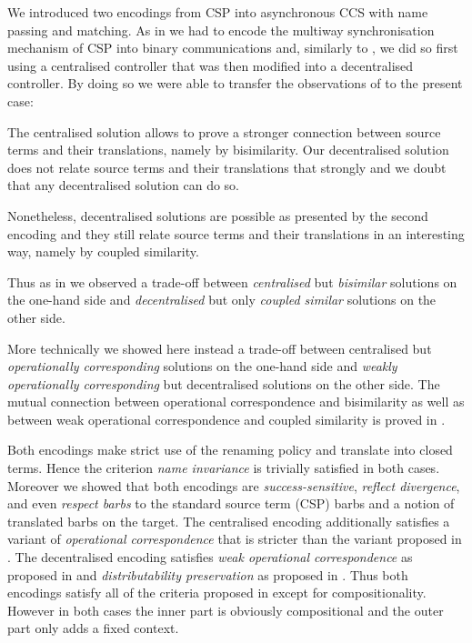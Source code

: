 \documentclass[copyright,creativecommons]{eptcs}
\begin{document}
We introduced two encodings from CSP into asynchronous CCS with name passing and matching.
As in \cite{parrowCoupled92} we had to encode the multiway synchronisation mechanism of CSP into binary communications and, similarly to \cite{parrowCoupled92}, we did so first using a centralised controller that was then modified into a decentralised controller.
By doing so we were able to transfer the observations of \cite{parrowCoupled92} to the present case:
\begin{compactenum}
	\item The centralised solution allows to prove a stronger connection between source terms and their translations, namely by bisimilarity. Our decentralised solution does not relate source terms and their translations that strongly and we doubt that any decentralised solution can do so.
	\item Nonetheless, decentralised solutions are possible as presented by the second encoding and they still relate source terms and their translations in an interesting way, namely by coupled similarity.
\end{compactenum}
Thus as in \cite{parrowCoupled92} we observed a trade-off between \emph{centralised} but \emph{bisimilar} solutions on the one-hand side and \emph{decentralised} but only \emph{coupled similar} solutions on the other side.

More technically we showed here instead a trade-off between centralised but \emph{operationally corresponding} solutions on the one-hand side and \emph{weakly operationally corresponding} but decentralised solutions on the other side.
The mutual connection between operational correspondence and bisimilarity as well as between weak operational correspondence and coupled similarity is proved in \cite{petersGlabbeek15}.

Both encodings make strict use of the renaming policy and translate into closed terms.
Hence the criterion \emph{name invariance} is trivially satisfied in both cases.
Moreover we showed that both encodings are \emph{success-sensitive}, \emph{reflect divergence}, and even \emph{respect barbs} \wrt to the standard source term (CSP) barbs and a notion of translated barbs on the target.
The centralised encoding  additionally satisfies a variant of \emph{operational correspondence} that is stricter than the variant proposed in \cite{gorla10}.
The decentralised encoding  satisfies \emph{weak operational correspondence} as proposed in \cite{gorla10} and \emph{distributability preservation} as proposed in \cite{petersNestmannGoltz13}.
Thus both encodings satisfy all of the criteria proposed in \cite{gorla10} except for compositionality.
However in both cases the inner part is obviously compositional and the outer part only adds a fixed context.

\providecommand{\thisvolume}[2][]{this volume of EPTCS}
\def\opa{}

\end{document}
